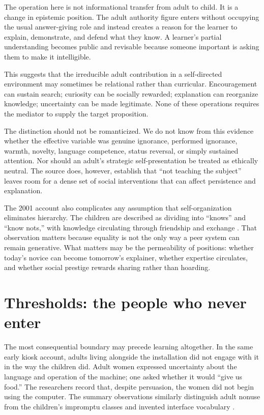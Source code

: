 \documentclass[11pt]{article}
\begin{document}
The operation here is not informational transfer from adult to child. It is a change in epistemic position. The adult authority figure enters without occupying the usual answer-giving role and instead creates a reason for the learner to explain, demonstrate, and defend what they know. A learner's partial understanding becomes public and revisable because someone important is asking them to make it intelligible.

This suggests that the irreducible adult contribution in a self-directed environment may sometimes be relational rather than curricular. Encouragement can sustain search; curiosity can be socially rewarded; explanation can reorganize knowledge; uncertainty can be made legitimate. None of these operations requires the mediator to supply the target proposition.

The distinction should not be romanticized. We do not know from this evidence whether the effective variable was genuine ignorance, performed ignorance, warmth, novelty, language competence, status reversal, or simply sustained attention. Nor should an adult's strategic self-presentation be treated as ethically neutral. The source does, however, establish that ``not teaching the subject'' leaves room for a dense set of social interventions that can affect persistence and explanation.

The 2001 account also complicates any assumption that self-organization eliminates hierarchy. The children are described as dividing into ``knows'' and ``know nots,'' with knowledge circulating through friendship and exchange \citep{mitra2001children}. That observation matters because equality is not the only way a peer system can remain generative. What matters may be the permeability of positions: whether today's novice can become tomorrow's explainer, whether expertise circulates, and whether social prestige rewards sharing rather than hoarding.

\section{Thresholds: the people who never enter}
The most consequential boundary may precede learning altogether. In the same early kiosk account, adults living alongside the installation did not engage with it in the way the children did. Adult women expressed uncertainty about the language and operation of the machine; one asked whether it would ``give us food.'' The researchers record that, despite persuasion, the women did not begin using the computer. The summary observations similarly distinguish adult nonuse from the children's impromptu classes and invented interface vocabulary \citep{mitra2001children}.
\end{document}
